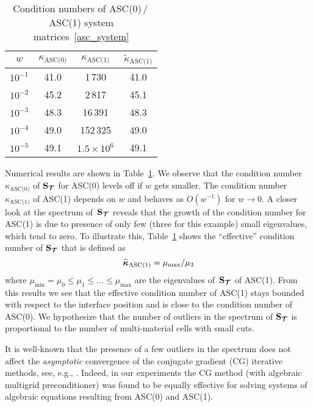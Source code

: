 \begin{table}[h]
	\centering
	\caption{Condition numbers of ASC(0)\,/\,ASC(1) system matrices~\eqref{asc_system} \label{fig:w:res}}
	\begin{tabular}[1.2]{ | c | c | c | c |}
		\hline
		$w$ & $\kappa_{\text{ASC(0)}}$ & $\kappa_{\text{ASC(1)}}$ & $\widetilde\kappa_{\text{ASC(1)}}$\\
		\hline
		$10^{-1}$ & 41.0 & 1\,730       & 41.0  \\
		\hline
		$10^{-2}$ & 45.2 & 2\,817       & 45.1  \\
		\hline
		$10^{-3}$ & 48.3 & 16\,391      & 48.3   \\
		\hline
		$10^{-4}$ & 49.0 & 152\,325     & 49.0    \\
		\hline
		$10^{-5}$ & 49.1 & $1.5\times10^6$&49.1  \\
		\hline
	\end{tabular}%
\end{table}

Numerical results are shown in Table~\ref{fig:w:res}. We observe that the condition number~$\kappa_{\text{ASC(0)}}$ of $\boldsymbol{\mathbf{S}}_{\boldsymbol{\mathbf{\mathcal T}}}$ for ASC(0) levels off if $w$ gets smaller. The condition number~$\kappa_{\text{ASC(1)}}$ of ASC(1) depends on $w$ and behaves as $O(w^{-1})$ for $w\to0$. A closer look at the spectrum of~$\boldsymbol{\mathbf{S}}_{\boldsymbol{\mathbf{\mathcal T}}}$ reveals that the growth of the condition number for ASC(1) is due to presence of only few (three for this example) small eigenvalues, which tend to zero. To illustrate this, Table~\ref{fig:w:res} shows the ``effective'' condition number of $\boldsymbol{\mathbf{S}}_{\boldsymbol{\mathbf{\mathcal T}}}$ that is defined as
$$
	\widetilde{\boldsymbol{\mathbf{\kappa}}}_{\text{ASC(1)}} = {\mu_{\text{max}}}/{\mu_3}
$$
where $\mu_{\text{min}} = \mu_0 \le \mu_1 \le \dots \le \mu_{\text{max}}$ are the eigenvalues of~$\boldsymbol{\mathbf{S}}_{\boldsymbol{\mathbf{\mathcal T}}}$ of ASC(1). From this results we see that the effective condition number of ASC(1) stays bounded with respect to the interface position and is  close to the condition number of ASC(0). We hypothesize that the number of outliers in the  spectrum of $\boldsymbol{\mathbf{S}}_{\boldsymbol{\mathbf{\mathcal T}}}$ is proportional to the number of multi-material cells with small cuts.
	
It is well-known that the presence of a few outliers in the spectrum does not affect the \emph{asymptotic} convergence of the conjugate gradient (CG) iterative methods, see, e.g., \cite{olshanskii2014iterative}. Indeed, in our experiments the CG method (with algebraic multigrid preconditioner) was found to be equally effective for solving systems of algebraic equations resulting from ASC(0) and ASC(1).
	
